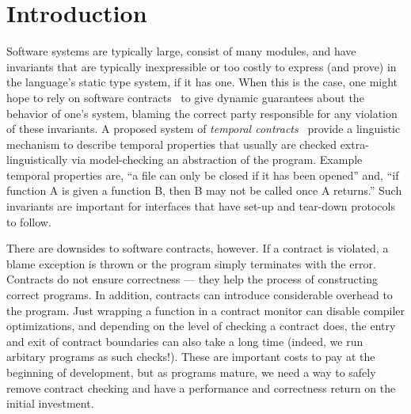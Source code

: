 \section{Introduction}

Software systems are typically large, consist of many modules, and have invariants that are typically inexpressible or too costly to express (and prove) in the language's static type system, if it has one.
%
When this is the case, one might hope to rely on software contracts~\cite{dvanhorn:Findler2002Contracts} to give dynamic guarantees about the behavior of one's system, blaming the correct party responsible for any violation of these invariants.
%
A proposed system of \emph{temporal contracts}~\citep{ianjohnson:dfm:icfp2011} provide a linguistic mechanism to describe temporal properties that usually are checked extra-linguistically via model-checking an abstraction of the program.
%
Example temporal properties are, ``a file can only be closed if it has been opened'' and, ``if function A is given a function B, then B may not be called once A returns.''
%
Such invariants are important for interfaces that have set-up and tear-down protocols to follow.

There are downsides to software contracts, however.
%
If a contract is violated, a blame exception is thrown or the program simply terminates with the error.
%
Contracts do not ensure correctness --- they help the process of constructing correct programs.
%
In addition, contracts can introduce considerable overhead to the program.
%
Just wrapping a function in a contract monitor can disable compiler optimizations, and depending on the level of checking a contract does, the entry and exit of contract boundaries can also take a long time (indeed, we run arbitary programs as such checks!).
%
These are important costs to pay at the beginning of development, but as programs mature, we need a way to safely remove contract checking and have a performance and correctness return on the initial investment.

